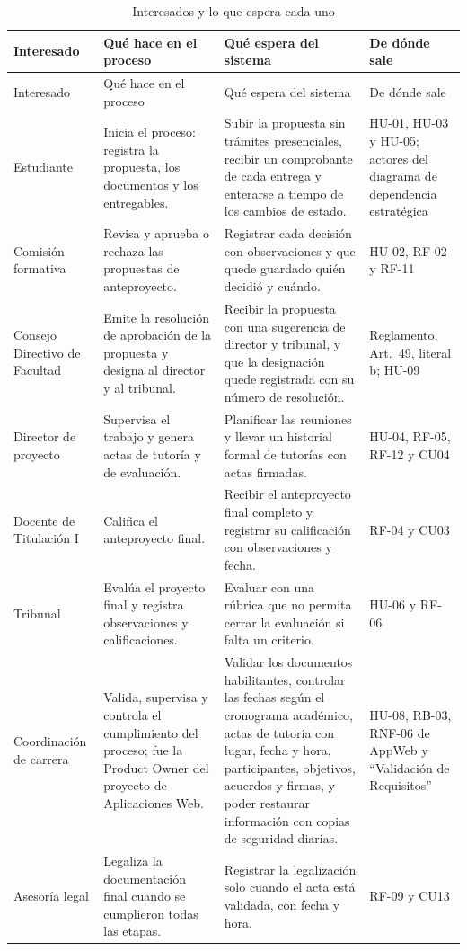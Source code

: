 \begingroup
\footnotesize
\setlength{\tabcolsep}{3pt}
\begin{longtable}{@{}L{2.4cm}L{3.7cm}L{5.3cm}L{3.6cm}@{}}
\caption{Interesados y lo que espera cada uno}\label{tab:interesados}\\
\toprule
Interesado & Qué hace en el proceso & Qué espera del sistema & De dónde sale \\
\midrule
\endfirsthead
\toprule
Interesado & Qué hace en el proceso & Qué espera del sistema & De dónde sale \\
\midrule
\endhead
\endfoot
\bottomrule
\endlastfoot
Estudiante & Inicia el proceso: registra la propuesta, los documentos y los entregables. & Subir la propuesta sin trámites presenciales, recibir un comprobante de cada entrega y enterarse a tiempo de los cambios de estado. & HU-01, HU-03 y HU-05; actores del diagrama de dependencia estratégica \\
\midrule
Comisión formativa & Revisa y aprueba o rechaza las propuestas de anteproyecto. & Registrar cada decisión con observaciones y que quede guardado quién decidió y cuándo. & HU-02, RF-02 y RF-11 \\
\midrule
Consejo Directivo de Facultad & Emite la resolución de aprobación de la propuesta y designa al director y al tribunal. & Recibir la propuesta con una sugerencia de director y tribunal, y que la designación quede registrada con su número de resolución. & Reglamento, Art.~49, literal b; HU-09 \\
\midrule
Director de proyecto & Supervisa el trabajo y genera actas de tutoría y de evaluación. & Planificar las reuniones y llevar un historial formal de tutorías con actas firmadas. & HU-04, RF-05, RF-12 y CU04 \\
\midrule
Docente de Titulación I & Califica el anteproyecto final. & Recibir el anteproyecto final completo y registrar su calificación con observaciones y fecha. & RF-04 y CU03 \\
\midrule
Tribunal & Evalúa el proyecto final y registra observaciones y calificaciones. & Evaluar con una rúbrica que no permita cerrar la evaluación si falta un criterio. & HU-06 y RF-06 \\
\midrule
Coordinación de carrera & Valida, supervisa y controla el cumplimiento del proceso; fue la Product Owner del proyecto de Aplicaciones Web. & Validar los documentos habilitantes, controlar las fechas según el cronograma académico, actas de tutoría con lugar, fecha y hora, participantes, objetivos, acuerdos y firmas, y poder restaurar información con copias de seguridad diarias. & HU-08, RB-03, RNF-06 de AppWeb y \enquote{Validación de Requisitos} \\
\midrule
Asesoría legal & Legaliza la documentación final cuando se cumplieron todas las etapas. & Registrar la legalización solo cuando el acta está validada, con fecha y hora. & RF-09 y CU13 \\
\end{longtable}
\endgroup

